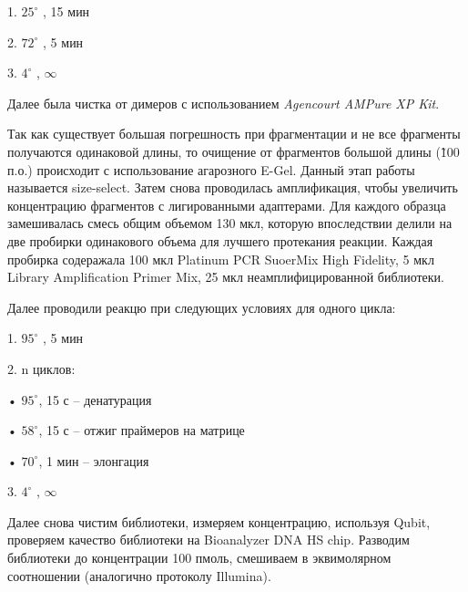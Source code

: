 1.	$25^{\circ}$ , 15 мин 

2.	$72^{\circ}$ , 5 мин

3.  $4^{\circ}$ ,  $\infty$

Далее была чистка от димеров с использованием \textit{Agencourt AMPure XP Kit}.

Так как существует большая погрешность при фрагментации и не все фрагменты получаются одинаковой длины, то очищение от фрагментов большой длины (\~100 п.о.) происходит с использование агарозного E-Gel. Данный этап работы называется size-select. Затем снова проводилась амплификация, чтобы увеличить концентрацию фрагментов с лигированными адаптерами. Для каждого образца замешивалась смесь общим объемом 130 мкл, которую впоследствии делили на две пробирки одинакового объема для лучшего протекания реакции. Каждая пробирка содеражала 100 мкл Platinum PCR SuoerMix High Fidelity, 5 мкл Library Amplification Primer Mix, 25 мкл неамплифицированной библиотеки. 

Далее проводили реакцю при следующих условиях для одного цикла:

1.	$95^{\circ}$ , 5 мин 

2.	n циклов:

•	$95^{\circ}$, 15 с – денатурация

•	$58^{\circ}$, 15 с – отжиг праймеров на матрице

•	$70^{\circ}$, 1 мин – элонгация

3.  $4^{\circ}$ ,  $\infty$

Далее снова чистим библиотеки, измеряем концентрацию, используя Qubit, проверяем качество библиотеки на Bioanalyzer DNA HS chip. Разводим библиотеки до концентрации 100 пмоль, смешиваем в эквимолярном соотношении (аналогично протоколу Illumina). 

\clearpage

